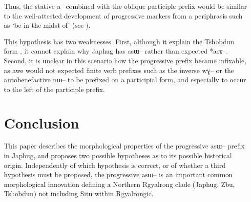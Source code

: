 \documentclass[oldfontcommands,oneside,a4paper,11pt]{article}
\newcommand{\ipa}[1]{{\phon \mbox{#1}}} %
\begin{document}
Thus, the stative \ipa{a--} combined with the oblique participle prefix would be similar to the well-attested development of progressive markers from a periphrasis such as `be in the midst of'  (see \citealt[134-137]{bybee94TAM}).

This hypothesis has two weaknesses. First, although it explain the Tshobdun form , it cannot explain why Japhug has \ipa{asɯ--} rather than expected *\ipa{asɤ--}. Second, it is unclear in this scenario how the progressive prefix became infixable, as awe would not expected finite verb prefixes such as the inverse \ipa{wɣ--} or the autobenefactive \ipa{nɯ--} to be prefixed on a participial form, and especially to occur to the left of the participle prefix. 

\section{Conclusion}
This paper describes the morphological properties of the progressive \ipa{asɯ--} prefix in Japhug, and proposes two possible hypotheses as to its possible historical origin. Independently of which hypothesis is correct, or of whether a third hypothesis must be proposed, the progressive \ipa{asɯ--} is an important common morphological innovation defining a Northern Rgyalrong clade (Japhug, Zbu, Tshobdun) not including Situ within Rgyalrongic.

  


\end{document}
